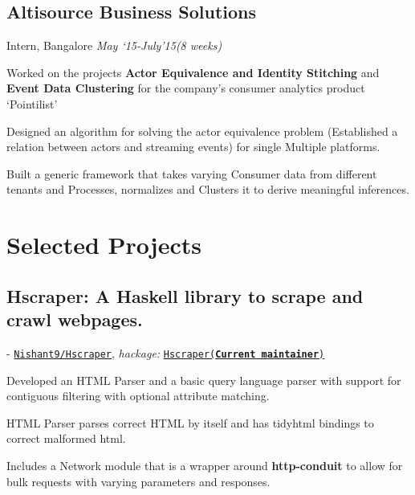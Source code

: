 \documentclass[a4paper]{twentysecondcv} %
\begin{document}
\subsection{ \textbf{Altisource Business Solutions} }
\vspace{-2mm}
Intern, Bangalore \hfill \emph{May `15-July'15(8 weeks)}\\
\vspace{-3mm}
\begin{list3}
\item Worked on the projects \textbf{Actor Equivalence and Identity Stitching} and \textbf{Event Data Clustering} for the company's consumer analytics product `Pointilist'
\item Designed an algorithm for solving the actor equivalence problem (Established a relation between actors and streaming events) for single Multiple platforms.
\item Built a generic framework that takes varying Consumer data from different tenants and Processes, normalizes and Clusters it to derive meaningful inferences.
  \newline
  \newline
  \newline
\end{list3} 

\vspace{-2mm}
\section{Selected Projects}
\vspace{-2mm}
\subsection{\textbf{Hscraper: A Haskell library to scrape and crawl webpages.}}
\vspace{-2mm}
\hspace{1mm}- \faGithub
\href{http://www.github.com/Nishant9/Hscraper}{\texttt{Nishant9/Hscraper}}, 
\textit{hackage:}
\href{https://hackage.haskell.org/package/hScraper}{\texttt{Hscraper(\textbf{Current maintainer})}}
\hfill
\vspace{1mm}
\begin{list3}%
\item Developed an HTML Parser and a basic query language parser with support for contiguous filtering with optional attribute matching.
\item HTML Parser parses correct HTML by itself and has tidyhtml
  bindings to correct malformed html.
\item Includes a Network module that is a wrapper around
  \textbf{http-conduit} to allow for bulk requests with varying
  parameters and responses.
  \newline
  \newline
\end{list3}
\end{document}
